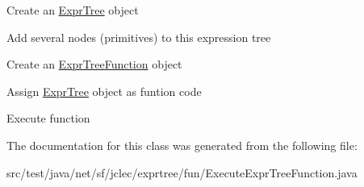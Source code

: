 \begin{DoxyItemize}
\item Create an \hyperlink{classnet_1_1sf_1_1jclec_1_1exprtree_1_1_expr_tree}{Expr\-Tree} object 
\item Add several nodes (primitives) to this expression tree 
\item Create an \hyperlink{classnet_1_1sf_1_1jclec_1_1exprtree_1_1fun_1_1_expr_tree_function}{Expr\-Tree\-Function} object 
\item Assign \hyperlink{classnet_1_1sf_1_1jclec_1_1exprtree_1_1_expr_tree}{Expr\-Tree} object as funtion code 
\item Execute function 
\end{DoxyItemize}

The documentation for this class was generated from the following file\-:\begin{DoxyCompactItemize}
\item 
src/test/java/net/sf/jclec/exprtree/fun/Execute\-Expr\-Tree\-Function.\-java\end{DoxyCompactItemize}
